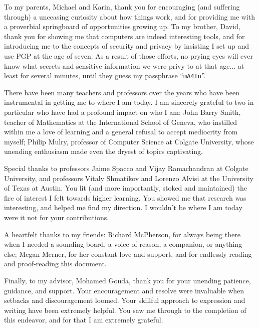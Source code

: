 To my parents, Michael and Karin, thank you for encouraging (and suffering through) a unceasing curiosity about how things work,
    and for providing me with a proverbial springboard of opportunities growing up.
To my brother, David, thank you for showing me that computers are indeed interesting tools,
    and for introducing me to the concepts of security and privacy by insisting I set up and use PGP at the age of seven.
As a result of those efforts, no prying eyes will ever know what secrets and sensitive information we were privy to at that age...
    at least for several minutes, until they guess my passphrase ``\texttt{mA4Tn}''.

There have been many teachers and professors over the years who have been instrumental in getting me to where I am today.
I am sincerely grateful to two in particular who have had a profound impact on who I am:
    John Barry Smith, teacher of Mathematics at the International School of Geneva,
        who instilled within me a love of learning and a general refusal to accept mediocrity from myself;
    Philip Mulry, professor of Computer Science at Colgate University,
        whose unending enthusiasm made even the dryest of topics captivating.

Special thanks to professors Jaime Spacco and Vijay Ramachandran at Colgate University,
    and professors Vitaly Shmatikov and Lorenzo Alvisi at the University of Texas at Austin.
You lit (and more importantly, stoked and maintained) the fire of interest I felt towards higher learning.
You showed me that research was interesting, and helped me find my direction.
I wouldn't be where I am today were it not for your contributions.

A heartfelt thanks to my friends:
    Richard McPherson, for always being there when I needed a sounding-board, a voice of reason, a companion, or anything else;
    Megan Merner, for her constant love and support, and for endlessly reading and proof-reading this document.

Finally, to my advisor, Mohamed Gouda, thank you for your unending patience, guidance, and support.
Your encouragement and resolve were invaluable when setbacks and discouragement loomed.
Your skillful approach to expression and writing have been extremely helpful.
You saw me through to the completion of this endeavor, and for that I am extremely grateful.
